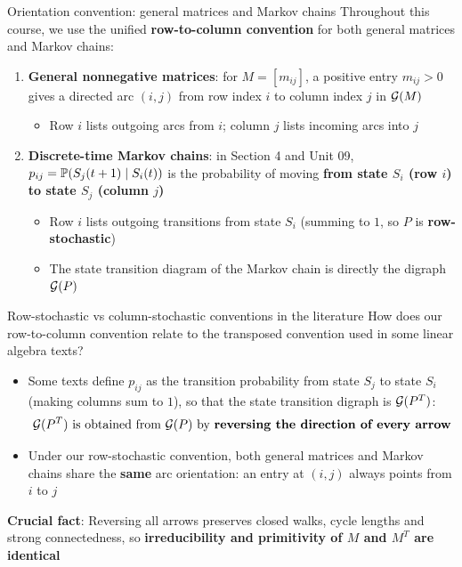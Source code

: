 \documentclass[aspectratio=169]{beamer}\usepackage[]{graphicx}\usepackage[]{xcolor}
\begin{document}
\begin{frame}{Orientation convention: general matrices and Markov chains}
Throughout this course, we use the unified \textbf{row-to-column convention} for both general matrices and Markov chains:
\vfill
\begin{enumerate}
\item \textbf{General nonnegative matrices}: for $M = [m_{ij}]$, a positive entry $m_{ij} > 0$ gives a directed arc $(i, j)$ from row index $i$ to column index $j$ in $\mathcal{G}(M)$
\begin{itemize}
\item Row $i$ lists outgoing arcs from $i$; column $j$ lists incoming arcs into $j$
\end{itemize}
\vfill
\item \textbf{Discrete-time Markov chains}: in Section 4 and Unit 09, $p_{ij} = \mathbb{P}(S_j(t+1) \mid S_i(t))$ is the probability of moving \textbf{from state $S_i$ (row $i$) to state $S_j$ (column $j$)}
\begin{itemize}
\item Row $i$ lists outgoing transitions from state $S_i$ (summing to $1$, so $P$ is \textbf{row-stochastic})
\item The state transition diagram of the Markov chain is directly the digraph $\mathcal{G}(P)$
\end{itemize}
\end{enumerate}
\end{frame}

\begin{frame}{Row-stochastic vs column-stochastic conventions in the literature}
How does our row-to-column convention relate to the transposed convention used in some linear algebra texts?
\vfill
\begin{itemize}
\item Some texts define $p_{ij}$ as the transition probability from state $S_j$ to state $S_i$ (making columns sum to $1$), so that the state transition digraph is $\mathcal{G}(P^T)$:
\[
\mathcal{G}(P^T) \text{ is obtained from } \mathcal{G}(P) \text{ by \textbf{reversing the direction of every arrow}}
\]
\item Under our row-stochastic convention, both general matrices and Markov chains share the \textbf{same} arc orientation: an entry at $(i, j)$ always points from $i$ to $j$
\end{itemize}
\vfill
\textbf{Crucial fact}: Reversing all arrows preserves closed walks, cycle lengths and strong connectedness, so \textbf{irreducibility and primitivity of $M$ and $M^T$ are identical}
\end{frame}
\end{document}
